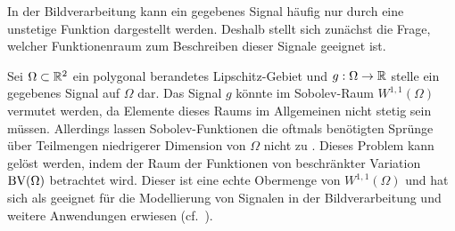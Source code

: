 In der Bildverarbeitung kann ein gegebenes Signal häufig nur durch eine
unstetige Funktion dargestellt werden. Deshalb stellt sich zunächst die Frage,
welcher Funktionenraum zum Beschreiben dieser Signale geeignet ist.

Sei $\Omega\subset\mathbb{R}^2$ ein polygonal berandetes Lipschitz-Gebiet und
$g:\Omega\to \mathbb{R}$ stelle ein gegebenes Signal auf $\Omega$ dar. 
Das Signal $g$ könnte im Sobolev-Raum $W^{1,1}(\Omega)$ vermutet werden, da
Elemente dieses Raums im Allgemeinen nicht stetig sein müssen. 
Allerdings lassen Sobolev-Funktionen die oftmals benötigten Sprünge über
Teilmengen niedrigerer Dimension von $\Omega$ nicht zu
\cite[297]{Bar15}.
Dieses Problem kann gelöst werden, indem der Raum der Funktionen von
beschränkter Variation $\textup{BV}(\Omega)$ betrachtet wird. 
Dieser ist eine echte Obermenge von $W^{1,1}(\Omega)$ und hat sich als geeignet
für die Modellierung von Signalen in der Bildverarbeitung und weitere
Anwendungen erwiesen (cf.\ \cites[393]{ABM14}[42]{AK06}[297]{Bar15}[S. 1
f.]{Bra98}).

